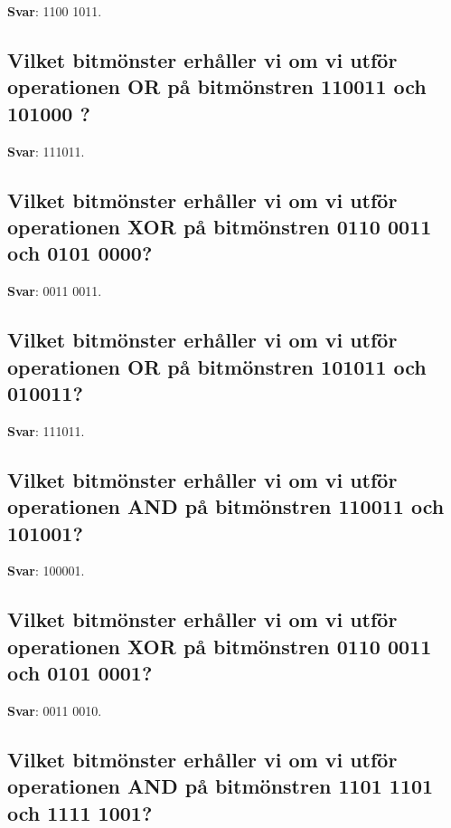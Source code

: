 \documentclass[a4paper,11pt,oneside]{article}
\begin{document}
\begin{sloppypar}
\textbf{Svar}: 1100 1011.



\subsection{Vilket bitm\"onster erh\r{a}ller vi om vi utf\"or operationen OR p\r{a} bitm\"onstren 110011 och 101000 ?}

\label{q:412:sa:sv:True}

\textbf{Svar}: 111011.



\subsection{Vilket bitm\"onster erh\r{a}ller vi om vi utf\"or operationen XOR p\r{a} bitm\"onstren 0110 0011 och 0101 0000?}

\label{q:413:sa:sv:True}

\textbf{Svar}: 0011 0011.



\subsection{Vilket bitm\"onster erh\r{a}ller vi om vi utf\"or operationen OR p\r{a} bitm\"onstren 101011 och 010011?}

\label{q:414:sa:sv:True}

\textbf{Svar}: 111011.



\subsection{Vilket bitm\"onster erh\r{a}ller vi om vi utf\"or operationen AND p\r{a} bitm\"onstren 110011 och 101001?}

\label{q:415:sa:sv:True}

\textbf{Svar}: 100001.



\subsection{Vilket bitm\"onster erh\r{a}ller vi om vi utf\"or operationen XOR p\r{a} bitm\"onstren 0110 0011 och 0101 0001?}

\label{q:416:sa:sv:True}

\textbf{Svar}: 0011 0010.



\subsection{Vilket bitm\"onster erh\r{a}ller vi om vi utf\"or operationen AND p\r{a} bitm\"onstren 1101 1101 och 1111 1001?}


\end{sloppypar}
\end{document}
